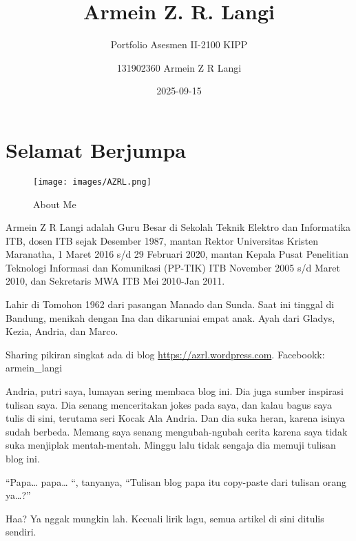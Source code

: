 \documentclass[
  letterpaper,
  DIV=11,
  numbers=noendperiod]{scrreprt}
\title{Armein Z. R. Langi}
\subtitle{Portfolio Asesmen II-2100 KIPP}
\author{131902360 Armein Z R Langi}
\date{2025-09-15}
\renewcommand*\contentsname{Table of contents}
\newcommand\contentsname{Table of contents}
\begin{document}
\maketitle

\renewcommand*\contentsname{Table of contents}
{
\hypersetup{linkcolor=}
\setcounter{tocdepth}{2}
\tableofcontents
}


\chapter*{Selamat Berjumpa}\label{selamat-berjumpa}


\begin{figure}[H]

{\centering \texttt{[image: images/AZRL.png]}

}

\caption{About Me}

\end{figure}%

Armein Z R Langi adalah Guru Besar di Sekolah Teknik Elektro dan
Informatika ITB, dosen ITB sejak Desember 1987, mantan Rektor
Universitas Kristen Maranatha, 1 Maret 2016 s/d 29 Februari 2020, mantan
Kepala Pusat Penelitian Teknologi Informasi dan Komunikasi (PP-TIK) ITB
November 2005 s/d Maret 2010, dan Sekretaris MWA ITB Mei 2010-Jan 2011.

Lahir di Tomohon 1962 dari pasangan Manado dan Sunda. Saat ini tinggal
di Bandung, menikah dengan Ina dan dikaruniai empat anak. Ayah dari
Gladys, Kezia, Andria, dan Marco.

Sharing pikiran singkat ada di blog \url{https://azrl.wordpress.com}.
Facebookk: armein\_langi

Andria, putri saya, lumayan sering membaca blog ini. Dia juga sumber
inspirasi tulisan saya. Dia senang menceritakan jokes pada saya, dan
kalau bagus saya tulis di sini, terutama seri Kocak Ala Andria. Dan dia
suka heran, karena isinya sudah berbeda. Memang saya senang
mengubah-ngubah cerita karena saya tidak suka menjiplak mentah-mentah.
Minggu lalu tidak sengaja dia memuji tulisan blog ini.

``Papa\ldots{} papa\ldots{} ``, tanyanya, ``Tulisan blog papa itu
copy-paste dari tulisan orang ya\ldots?''

Haa? Ya nggak mungkin lah. Kecuali lirik lagu, semua artikel di sini
ditulis sendiri.
\end{document}
